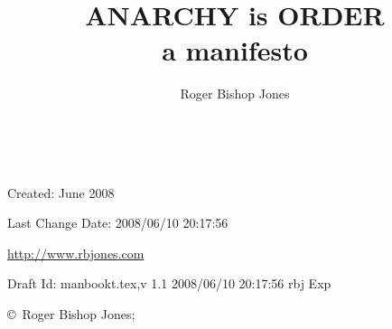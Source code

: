 \documentclass[10pt,titlepage,openany]{article}
\author{Roger Bishop Jones}
\title{ANARCHY is ORDER\\a manifesto}
\date{\ }
\begin{document}
\begin{titlepage}
\maketitle


\begin{centering}

{\footnotesize

Created: June 2008

Last Change $ $Date: 2008/06/10 20:17:56 $ $

\href{http://www.rbjones.com/}
{http://www.rbjones.com}

Draft $ $Id: manbookt.tex,v 1.1 2008/06/10 20:17:56 rbj Exp $ $

\copyright\ Roger Bishop Jones;

}%

\end{centering}

\thispagestyle{empty}
\end{titlepage}

{\parskip=0pt\tableofcontents}
\end{document}

